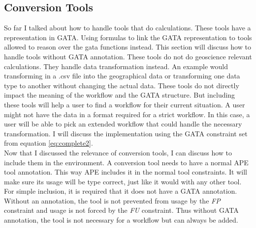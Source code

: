 \documentclass{article}
\begin{document}









\subsection{Conversion Tools}

So far I talked about how to handle tools that do calculations. These tools have a representation in GATA. Using formulas to link the GATA representation to tools allowed to reason over the gata functions instead. This section will discuss how to handle tools without GATA annotation. These tools do not do geoscience relevant calculations. They handle data transformation instead. An example would transforming in a .csv file into the geographical data or transforming one data type to another without changing the actual data. These tools do not directly impact the meaning of the workflow and the GATA structure. But including these tools will help a user to find a workflow for their current situation. A user might not have the data in a format required for a strict workflow. In this case, a user will be able to pick an extended workflow that could handle the necessary transformation. I will discuss the implementation using the GATA constraint set from equation \ref{eq:complete2}.
\\

Now that I discussed the relevance of conversion tools, I can discuss how to include them in the environment. A conversion tool needs to have a normal APE tool annotation. This way APE includes it in the normal tool constraints. It will make sure its usage will be type correct, just like it would with any other tool. For simple inclusion, it is required that it does not have a GATA annotation. Without an annotation, the tool is not prevented from usage by the \textit{FP} constraint and usage is not forced by the \textit{FU} constraint. Thus without GATA annotation, the tool is not necessary for a workflow but can always be added. 
\\
\end{document}
